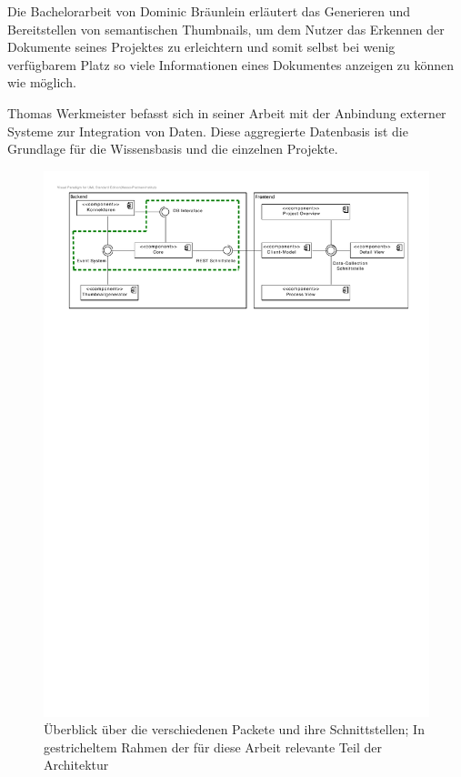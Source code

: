 Die Bachelorarbeit von Dominic Bräunlein \cite{bp-dome} erläutert das Generieren und Bereitstellen von semantischen \gls{Thumbnails}, um dem Nutzer das Erkennen der Dokumente seines Projektes zu erleichtern und somit selbst bei wenig verfügbarem Platz so viele Informationen eines Dokumentes anzeigen zu können wie möglich. 

Thomas Werkmeister befasst sich in seiner Arbeit \cite{bp-tewe} mit der Anbindung externer Systeme zur Integration von Daten. Diese aggregierte Datenbasis ist die Grundlage für die Wissensbasis und die einzelnen Projekte.

\begin{figure}[h]  
  \centering     
  \includegraphics[width=1.0\textwidth]{img/architecture_overview.pdf}  
   \caption{Überblick über die verschiedenen Packete und ihre Schnittstellen; In gestricheltem Rahmen der für diese Arbeit relevante Teil der Architektur}
  \label{fig:architecture-overview} 
\end{figure}

